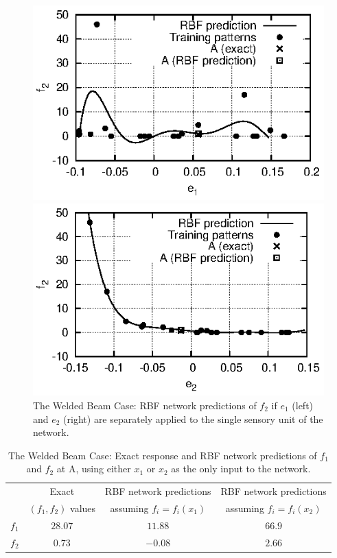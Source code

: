 \begin{figure}
\begin{minipage}{0.48\textwidth}
\includegraphics[scale=1.2]{IPE/f2_e1.eps}
\end{minipage}
\begin{minipage}{0.48\textwidth}
\includegraphics[scale=1.2]{IPE/f2_e2.eps}
\end{minipage}
\caption{The Welded Beam Case: RBF network predictions of $f_2$ if $e_1$ (left) and $e_2$ (right) are separately applied to the single sensory unit of the network. }
\label{fig:f2e1e2}
\end{figure}

\begin{table}[h!]
\begin{center}
\begin{tabular}{c  c | c | c}
		&      Exact  	 		&  RBF network predictions    &  RBF network  predictions   \\
		&  $(f_1,f_2)$ values   &  assuming $f_i=f_i(x_1)$    &   assuming $f_i=f_i(x_2)$  \\
		\hline
$f_1$	& $28.07$   &      $11.88$     &      $66.9$        \\
$f_2$	& $0.73$     &      $-0.08$     &      $2.66$        \\
\end{tabular}
\end{center}
\caption{The Welded Beam Case: Exact response and RBF network predictions of $f_1$ and $f_2$ at A, using either $x_1$ or $x_2$ as the only input to the network.}
\label{tab:f1f2x1x2}
\end{table}


